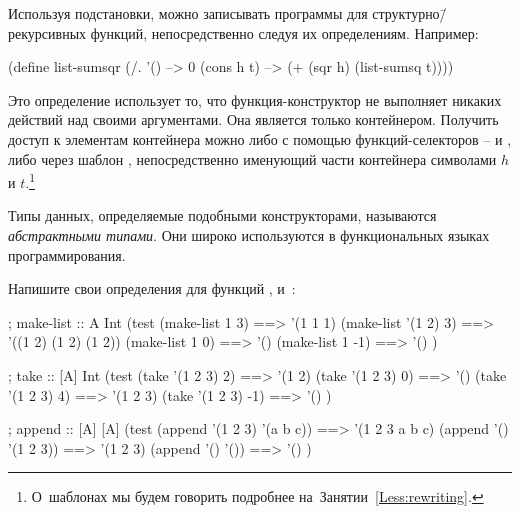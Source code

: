 %
Используя подстановки, можно записывать программы для структурно\=/рекурсивных функций, непосредственно следуя их определениям. Например:

\begin{SchemeCode}[emph={h,t}]
(define list-sumsqr
  (/. '() --> 0
      (cons h t) --> (+ (sqr h) (list-sumsq t))))
\end{SchemeCode}

Это определение использует то, что функция-конструктор  не выполняет никаких действий над своими аргументами. Она является только контейнером. Получить доступ к элементам контейнера можно либо с помощью функций-селекторов --  и , либо через шаблон , непосредственно именующий части контейнера символами $h$ и $t$.\footnote{О~шаблонах мы будем говорить подробнее на~Занятии~\ref{Less:rewriting}.}

Типы данных, определяемые подобными конструкторами, называются \emph{абстрактными типами}. Они широко используются в функциональных языках программирования.

\begin{Assignment}
Напишите свои определения для функций ,  и~:

\begin{Specification}
; make-list :: A Int \arrow [A]
(test 
  (make-list 1 3)      ==> '(1 1 1)
  (make-list '(1 2) 3) ==> '((1 2) (1 2) (1 2))
  (make-list 1 0)      ==> '()
  (make-list 1 -1)     ==> '() )
\end{Specification}

\vspace{-\medskipamount}
\begin{Specification}
; take :: [A] Int \arrow [A]
(test 
  (take '(1 2 3) 2)    ==>  '(1 2)
  (take '(1 2 3) 0)    ==>  '()
  (take '(1 2 3) 4)    ==>  '(1 2 3)
  (take '(1 2 3) -1)   ==>  '() )
\end{Specification}

\vspace{-\medskipamount}
\begin{Specification}
; append :: [A] [A] \arrow [A]
(test 
  (append '(1 2 3) '(a b c)) ==>  '(1 2 3 a b c)
  (append '() '(1 2 3))      ==>  '(1 2 3)
  (append '() '())           ==>  '() )
\end{Specification}
\end{Assignment}

